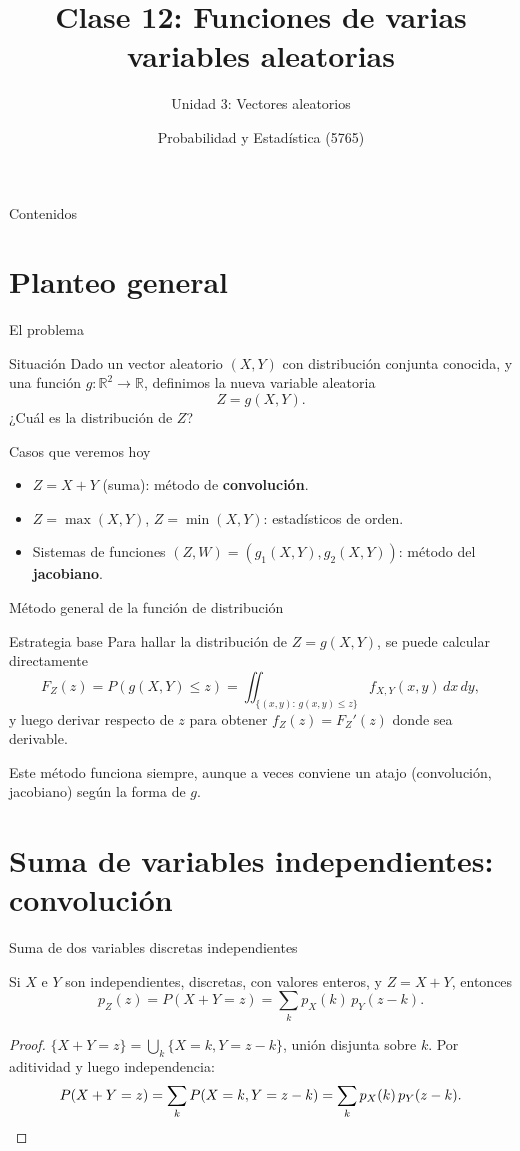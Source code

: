 \documentclass[aspectratio=169,11pt]{beamer}
\title[Prob. y Estadística]{Clase 12: Funciones de varias variables aleatorias}
\subtitle{Unidad 3: Vectores aleatorios}
\institute[UNS]{Universidad Nacional del Sur \\ Departamento de Matemática}
\author{Probabilidad y Estadística (5765)}
\date{}
\begin{document}
\begin{frame}
\titlepage
\end{frame}

\begin{frame}{Contenidos}
\tableofcontents
\end{frame}

\section{Planteo general}

\begin{frame}{El problema}
\begin{block}{Situación}
Dado un vector aleatorio $(X,Y)$ con distribución conjunta conocida, y una función $g:\mathbb{R}^2\to\mathbb{R}$, definimos la nueva variable aleatoria
\[
Z = g(X,Y).
\]
¿Cuál es la distribución de $Z$?
\end{block}
\pause
\begin{block}{Casos que veremos hoy}
\begin{itemize}
\item $Z = X+Y$ (suma): método de \textbf{convolución}.
\item $Z=\max(X,Y)$, $Z=\min(X,Y)$: estadísticos de orden.
\item Sistemas de funciones $(Z,W) = (g_1(X,Y), g_2(X,Y))$: método del \textbf{jacobiano}.
\end{itemize}
\end{block}
\end{frame}

\begin{frame}{Método general de la función de distribución}
\begin{block}{Estrategia base}
Para hallar la distribución de $Z=g(X,Y)$, se puede calcular directamente
\[
F_Z(z) = P(g(X,Y) \le z) = \iint_{\{(x,y):\, g(x,y)\le z\}} f_{X,Y}(x,y)\, dx\, dy,
\]
y luego derivar respecto de $z$ para obtener $f_Z(z) = F_Z'(z)$ donde sea derivable.
\end{block}
Este método funciona siempre, aunque a veces conviene un atajo (convolución, jacobiano) según la forma de $g$.
\end{frame}

\section{Suma de variables independientes: convolución}

\begin{frame}{Suma de dos variables discretas independientes}
\begin{theorem}
Si $X$ e $Y$ son independientes, discretas, con valores enteros, y $Z=X+Y$, entonces
\[
p_Z(z) = P(X+Y=z) = \sum_{k} p_X(k)\, p_Y(z-k).
\]
\end{theorem}
\begin{proof}
$\{X+Y=z\} = \bigcup_k \{X=k, Y=z-k\}$, unión disjunta sobre $k$. Por aditividad y luego independencia:
\[
P(X+Y=z) = \sum_k P(X=k,Y=z-k) = \sum_k p_X(k)\,p_Y(z-k). \qedhere
\]
\end{proof}
\end{frame}
\end{document}
